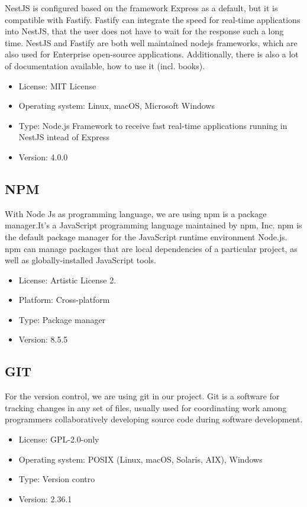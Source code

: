 \documentclass[12pt, a4paper]{article}
\begin{document}
NestJS is configured based on the framework Express as a default, but it is compatible with Fastify. Fastify can integrate the speed for real-time applications into NestJS, that the user does not have to wait for the response such a long time. 
NestJS and Fastify are both well maintained nodejs frameworks, which are also used for Enterprise open-source applications. Additionally, there is also a lot of documentation available, how to use it (incl. books).

\begin{itemize}
    \item License: MIT License
    \item Operating system:  Linux, macOS, Microsoft Windows
    \item Type: Node.js Framework to receive fast real-time applications running in NestJS intead of Express
    \item Version: 4.0.0
\end{itemize}

\subsection*{NPM}

With Node Js as programming language, we are using npm is a package manager.It's a JavaScript programming language maintained by npm, Inc. npm is the default package manager for the JavaScript runtime environment Node.js. npm can manage packages that are local dependencies of a particular project, as well as globally-installed JavaScript tools.

\begin{itemize}
    \item License: Artistic License 2.
    \item Platform: Cross-platform
    \item Type: Package manager
    \item Version: 8.5.5
\end{itemize}

\subsection*{GIT}

For the version control, we are using git in our project. Git is a software for tracking changes in any set of files, usually used for coordinating work among programmers collaboratively developing source code during software development.

\begin{itemize}
    \item License: GPL-2.0-only
    \item Operating system: POSIX (Linux, macOS, Solaris, AIX), Windows
    \item Type: Version contro
    \item Version: 2.36.1
\end{itemize}
\end{document}
